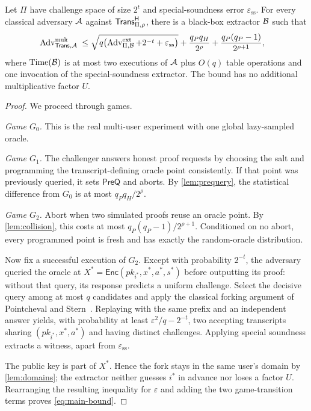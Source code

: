 \begin{theorem}
  \label{thm:main}
  Let $\Pi$ have challenge space of size $2^t$ and special-soundness error
  $\varepsilon_{\mathrm{ss}}$.  For every classical adversary $\mathcal{A}$ against
  $\mathsf{Trans}^{\mathsf{H}}_{\Pi,\rho}$, there is a black-box extractor $\mathcal{B}$ such that
  \begin{align}
  \operatorname{Adv}^{\mathrm{muk}}_{\mathsf{Trans},\mathcal{A}}
  \;&\le
  \sqrt{q\bigl(\operatorname{Adv}^{\mathrm{ext}}_{\Pi,\mathcal{B}}
             +2^{-t}+\varepsilon_{\mathrm{ss}}\bigr)}
  + \frac{q_Pq_H}{2^\rho}
  + \frac{q_P(q_P-1)}{2^{\rho+1}},
  \label{eq:main-bound}
  \end{align}
  where $\operatorname{Time}(\mathcal{B})$ is at most two executions of $\mathcal{A}$ plus
  $O(q)$ table operations and one invocation of the special-soundness
  extractor.  The bound has no additional multiplicative factor $U$.
\end{theorem}

\begin{proof}
  We proceed through games.

  \emph{Game $G_0$.} This is the real multi-user experiment with one global
  lazy-sampled oracle.

  \emph{Game $G_1$.} The challenger answers honest proof requests by choosing
  the salt and programming the transcript-defining oracle point consistently.
  If that point was previously queried, it sets $\mathsf{PreQ}$ and aborts.
  By \cref{lem:prequery}, the statistical difference from $G_0$ is at most
  $q_Pq_H/2^\rho$.

  \emph{Game $G_2$.} Abort when two simulated proofs reuse an oracle point.
  By \cref{lem:collision}, this costs at most
  $q_P(q_P-1)/2^{\rho+1}$.  Conditioned on no abort, every programmed point is
  fresh and has exactly the random-oracle distribution.

  Now fix a successful execution of $G_2$.  Except with probability $2^{-t}$,
  the adversary queried the oracle at
  $X^*=\mathsf{Enc}(pk_{i^*},x^*,a^*,s^*)$ before outputting its proof: without
  that query, its response predicts a uniform challenge.  Select the decisive
  query among at most $q$ candidates and apply the classical forking argument
  of Pointcheval and Stern~\cite{PointchevalStern1996}.  Replaying with the
  same prefix and an independent answer yields, with probability at least
  $\varepsilon^2/q-2^{-t}$, two accepting transcripts sharing
  $(pk_{i^*},x^*,a^*)$ and having distinct challenges.  Applying special
  soundness extracts a witness, apart from
  $\varepsilon_{\mathrm{ss}}$.

  The public key is part of $X^*$.  Hence the fork stays in the same user's
  domain by \cref{lem:domains}; the extractor neither guesses $i^*$ in advance
  nor loses a factor $U$.  Rearranging the resulting inequality for
  $\varepsilon$ and adding the two game-transition terms proves
  \cref{eq:main-bound}.
\end{proof}

